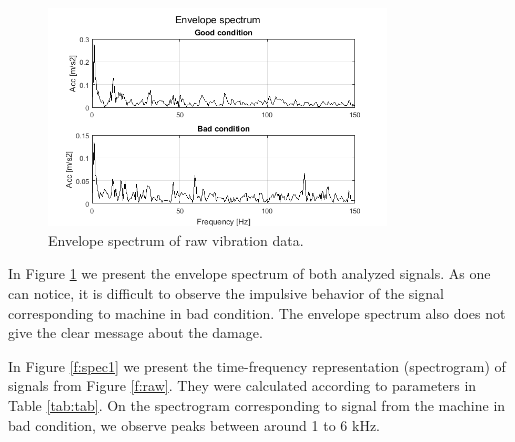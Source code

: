 \documentclass[11pt]{article}
\begin{document}
\begin{figure}[!ht]
\begin{center}
\includegraphics[width=0.8\textwidth]{envelope_raw.png}
\caption{Envelope spectrum of raw vibration data. \label{f:envelope_raw}}
\end{center}
\end{figure}


In Figure \ref{f:envelope_raw} we present the envelope spectrum of both analyzed signals. As one can notice, it is difficult to observe the impulsive behavior of the signal corresponding to machine in bad condition. The envelope spectrum also does not give the clear message about the damage. 



In Figure \ref{f:spec1} we present the  time-frequency representation (spectrogram) of signals from Figure \ref{f:raw}. They were calculated according to parameters in Table \ref{tab:tab}. On the spectrogram corresponding to signal from the machine in bad condition, we observe peaks between around 1 to 6 kHz. 
\end{document}
